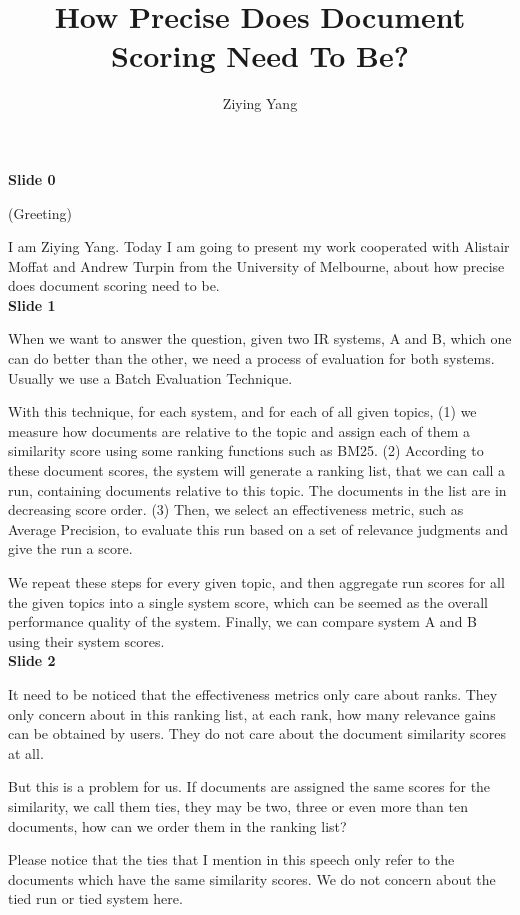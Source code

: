 \documentclass{article}
\title{\Large{\textbf{How Precise Does Document Scoring Need To Be?}}} %
\author{Ziying Yang}
\date{}
\begin{document}
\maketitle

\textbf{Slide 0}

(Greeting)

I am Ziying Yang. Today I am going to present my work cooperated with Alistair Moffat and Andrew Turpin from the University of Melbourne, about how precise does document scoring need to be.\\[1em]

\textbf{Slide 1}

When we want to answer the question, given two IR systems, A and B, which one can do better than the other, we need a process of evaluation for both systems. Usually we use a Batch Evaluation Technique. 

With this technique, for each system, and for each of all given topics, (1) we measure how documents are relative to the topic and assign each of them a similarity score using some ranking functions such as BM25. (2) According to these document scores, the system will generate a ranking list, that we can call a run, containing documents relative to this topic. The documents in the list are in decreasing score order. (3) Then, we select an effectiveness metric, such as Average Precision, to evaluate this run based on a set of relevance judgments and give the run a score.

We repeat these steps for every given topic, and then aggregate run scores for all the given topics into a single system score, which can be seemed as the overall performance quality of the system. Finally, we can compare system A and B using their system scores.\\[1em]

\textbf{Slide 2}

It need to be noticed that the effectiveness metrics only care about ranks. They only concern about in this ranking list, at each rank, how many relevance gains can be obtained by users. They do not care about the document similarity scores at all. 

But this is a problem for us. If documents are assigned the same scores for the similarity, we call them ties, they may be two, three or even more than ten documents, how can we order them in the ranking list?

Please notice that the ties that I mention in this speech only refer to the documents which have the same similarity scores. We do not concern about the tied run or tied system here. 
\end{document}
